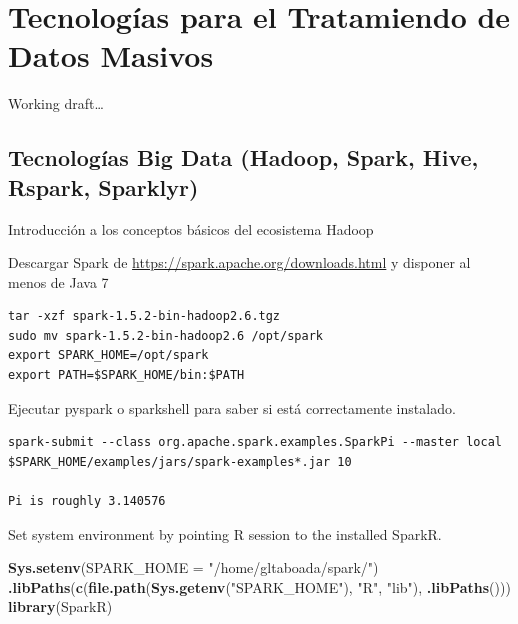\documentclass[]{book}
\newenvironment{Shaded}{\begin{snugshade}}{\end{snugshade}}
\newcommand{\DataTypeTok}[1]{\textcolor[rgb]{0.13,0.29,0.53}{#1}}
\newcommand{\KeywordTok}[1]{\textcolor[rgb]{0.13,0.29,0.53}{\textbf{#1}}}
\newcommand{\NormalTok}[1]{#1}
\newcommand{\StringTok}[1]{\textcolor[rgb]{0.31,0.60,0.02}{#1}}
\begin{document}
\hypertarget{tecnologias-para-el-tratamiendo-de-datos-masivos}{%
\chapter{Tecnologías para el Tratamiendo de Datos Masivos}\label{tecnologias-para-el-tratamiendo-de-datos-masivos}}

Working draft\ldots{}

\hypertarget{tecnologias-big-data-hadoop-spark-hive-rspark-sparklyr}{%
\section{Tecnologías Big Data (Hadoop, Spark, Hive, Rspark, Sparklyr)}\label{tecnologias-big-data-hadoop-spark-hive-rspark-sparklyr}}

Introducción a los conceptos básicos del ecosistema Hadoop

Descargar Spark de \url{https://spark.apache.org/downloads.html}
y disponer al menos de Java 7

\begin{verbatim}
tar -xzf spark-1.5.2-bin-hadoop2.6.tgz
sudo mv spark-1.5.2-bin-hadoop2.6 /opt/spark
export SPARK_HOME=/opt/spark
export PATH=$SPARK_HOME/bin:$PATH
\end{verbatim}

Ejecutar pyspark o sparkshell para saber si está correctamente instalado.

\begin{verbatim}
spark-submit --class org.apache.spark.examples.SparkPi --master local $SPARK_HOME/examples/jars/spark-examples*.jar 10

Pi is roughly 3.140576
\end{verbatim}

Set system environment by pointing R session to the installed SparkR.

\begin{Shaded}
\begin{Highlighting}[]
\KeywordTok{Sys.setenv}\NormalTok{(}\DataTypeTok{SPARK_HOME =} \StringTok{"/home/gltaboada/spark/"}\NormalTok{)}
\KeywordTok{.libPaths}\NormalTok{(}\KeywordTok{c}\NormalTok{(}\KeywordTok{file.path}\NormalTok{(}\KeywordTok{Sys.getenv}\NormalTok{(}\StringTok{"SPARK_HOME"}\NormalTok{), }\StringTok{"R"}\NormalTok{, }\StringTok{"lib"}\NormalTok{), }\KeywordTok{.libPaths}\NormalTok{()))}
\KeywordTok{library}\NormalTok{(SparkR)}
\end{Highlighting}
\end{Shaded}
\end{document}
